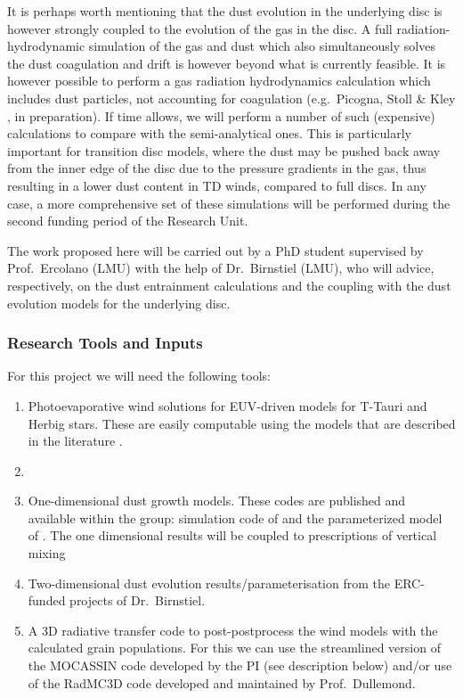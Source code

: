 \documentclass[10pt,fleqn,twoside]{article}
\begin{document}
It is perhaps worth mentioning that the dust evolution in the
underlying disc is however strongly coupled to the evolution of the gas
in the disc. A full radiation-hydrodynamic simulation of the gas and
dust which also simultaneously solves the dust coagulation and drift
is however beyond what is currently feasible. It is however possible
to perform a gas radiation hydrodynamics calculation which includes
dust particles, not accounting for coagulation (e.g.\ Picogna, Stoll \&
Kley ,
in preparation). If time allows, we will perform a number of such
(expensive) calculations to compare with the semi-analytical
ones. This is particularly important for transition disc models, where
the dust may be pushed back away from the inner edge of the disc due
to the pressure gradients in the gas, thus resulting in a  lower dust
content in TD winds, compared to full discs.  In any case, a more
comprehensive set of these simulations will be performed during the
second funding period of the Research Unit.  


The work proposed here will be carried out by a PhD student supervised by
Prof.\ Ercolano (LMU) with the help of Dr.\ Birnstiel (LMU), who will
advice, respectively, on the dust entrainment calculations and the 
coupling with the dust evolution models for the underlying disc. 

\subsubsection{Research Tools and Inputs}

For this project we will need the following tools:
\begin{enumerate}
\item Photoevaporative wind solutions for EUV-driven
models for T-Tauri and Herbig stars. These are easily computable 
using the models that are described in the literature \citep[e.g.,][]{2004ApJ...607..890F}.
\item {}
\item One-dimensional dust growth models. These codes are published
and available within the group: simulation code of 
 \citet{2010A&A...513A..79B} and the parameterized model of
 \citet{2012A&A...539A.148B}. The one dimensional results will be
 coupled to prescriptions of vertical mixing \citep[e.g.]{2009A&A...496..597F}
\item Two-dimensional dust evolution results/parameterisation from the
  ERC-funded projects of Dr.\ Birnstiel.
\item A 3D radiative transfer code to post-postprocess the wind
models with the calculated grain populations. For this we can use the
streamlined version of the {\sc MOCASSIN} code developed by the PI
(see description below) and/or use  of the
RadMC3D code developed and maintained by Prof.\ Dullemond. 
\end{enumerate}
\end{document}
